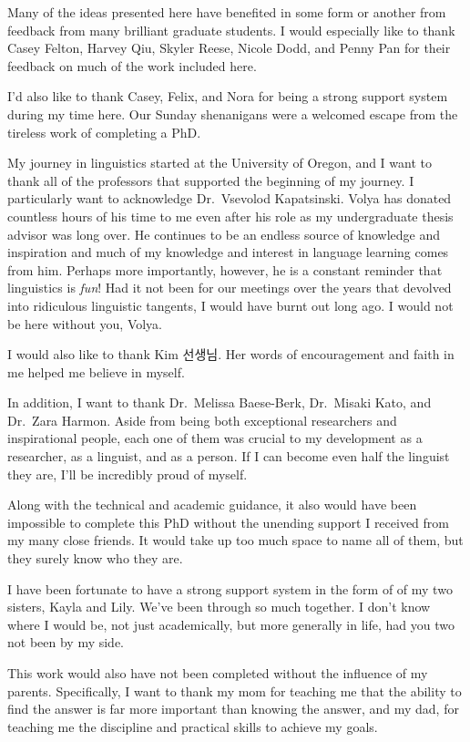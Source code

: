 \documentclass[
  letterpaper,
  DIV=11,
  numbers=noendperiod,
  nottoc,
  oneside]{scrreprt}
\begin{document}
Many of the ideas presented here have benefited in some form or another
from feedback from many brilliant graduate students. I would especially
like to thank Casey Felton, Harvey Qiu, Skyler Reese, Nicole Dodd, and
Penny Pan for their feedback on much of the work included here.

I'd also like to thank Casey, Felix, and Nora for being a strong support
system during my time here. Our Sunday shenanigans were a welcomed
escape from the tireless work of completing a PhD.

My journey in linguistics started at the University of Oregon, and I
want to thank all of the professors that supported the beginning of my
journey. I particularly want to acknowledge Dr.~Vsevolod Kapatsinski.
Volya has donated countless hours of his time to me even after his role
as my undergraduate thesis advisor was long over. He continues to be an
endless source of knowledge and inspiration and much of my knowledge and
interest in language learning comes from him. Perhaps more importantly,
however, he is a constant reminder that linguistics is \emph{fun}! Had
it not been for our meetings over the years that devolved into
ridiculous linguistic tangents, I would have burnt out long ago. I would
not be here without you, Volya.

I would also like to thank Kim 선생님. Her words of encouragement and
faith in me helped me believe in myself.

In addition, I want to thank Dr.~Melissa Baese-Berk, Dr.~Misaki Kato,
and Dr.~Zara Harmon. Aside from being both exceptional researchers and
inspirational people, each one of them was crucial to my development as
a researcher, as a linguist, and as a person. If I can become even half
the linguist they are, I'll be incredibly proud of myself.

Along with the technical and academic guidance, it also would have been
impossible to complete this PhD without the unending support I received
from my many close friends. It would take up too much space to name all
of them, but they surely know who they are.

I have been fortunate to have a strong support system in the form of of
my two sisters, Kayla and Lily. We've been through so much together. I
don't know where I would be, not just academically, but more generally
in life, had you two not been by my side.

This work would also have not been completed without the influence of my
parents. Specifically, I want to thank my mom for teaching me that the
ability to find the answer is far more important than knowing the
answer, and my dad, for teaching me the discipline and practical skills
to achieve my goals.
\end{document}
